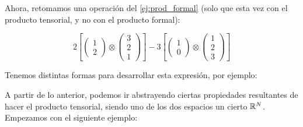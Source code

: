 \begin{ejemplo}
    Ahora, retomamos una operación del \ref{ej:prod_formal} (solo que esta vez con el producto tensorial, y no con el producto formal):

    $$
    2 \left[ \begin{pmatrix}1 \\ 2\end{pmatrix} \otimes \begin{pmatrix}3 \\ 2 \\ 1 \end{pmatrix} \right]
    - 3 \left[ \begin{pmatrix}1 \\ 0\end{pmatrix} \otimes \begin{pmatrix}1 \\ 2 \\ 3 \end{pmatrix} \right]
    $$

    Tenemos distintas formas para desarrollar esta expresión, por ejemplo:


\end{ejemplo}

A partir de lo anterior, podemos ir abstrayendo ciertas propiedades resultantes de hacer el producto tensorial, siendo uno de los dos espacios un cierto $\mathbb{R}^N$. Empezamos con el siguiente ejemplo:

